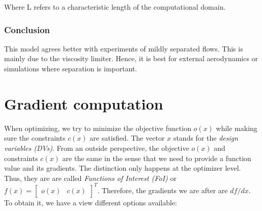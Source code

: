 \noindent Where L refers to a characteristic length of the computational
domain.




\subsubsection{Conclusion}
This model agrees better with experiments of mildly separated flows. This
is mainly due to the viscosity limiter. Hence, it is best for external
aerodynamics or simulations where separation is important. \cite{cfd101_sst}








\section{Gradient computation}
\label{sec:gradient_computation}
When optimizing, we try to minimize the objective function $o(x)$ while making
sure the constraints $c(x)$ are satisfied. The vector $x$ stands for the
\textit{design variables (DVs)}. From an outside perspective, the objective
$o(x)$ and constraints $c(x)$ are the same in the sense that we need to provide
a function value and its gradients. The distinction only happens at the
optimizer level. Thus, they are are called \textit{Functions of Interest (FoI)}
or $f(x) = \begin{bmatrix} o(x) & c(x)\end{bmatrix}^T$. Therefore, the
gradients we are after are $d f / d x$. To obtain it, we have a view different
options available: \cite{mdobook}


